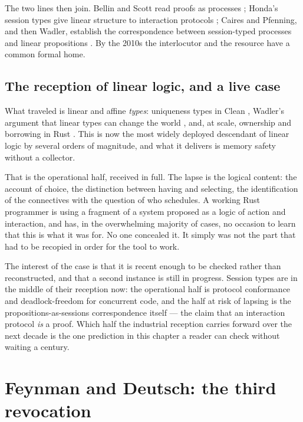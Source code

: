 The two lines then join.
Bellin and Scott read proofs as processes \cite{bellinscott};
Honda's session types give linear structure to interaction protocols
\cite{honda1993}; Caires and Pfenning, and then Wadler, establish
the correspondence between session-typed processes and linear
propositions \cite{cairespfenning,wadler}.
By the 2010s the interlocutor and the resource have a common formal
home.

\subsection{The reception of linear logic, and a live case}

What traveled is linear and affine \emph{types}: uniqueness types in
Clean \cite{barendsen1996}, Wadler's argument that linear types can
change the world \cite{wadler1990}, and, at scale, ownership and
borrowing in Rust \cite{jung2018}.
This is now the most widely deployed descendant of linear logic by
several orders of magnitude, and what it delivers is memory safety
without a collector.

That is the operational half, received in full.
The lapse is the logical content: the account of choice, the
distinction between having and selecting, the identification of the
connectives with the question of who schedules.
A working Rust programmer is using a fragment of a system proposed
as a logic of action and interaction, and has, in the overwhelming
majority of cases, no occasion to learn that this is what it was
for.
No one concealed it.
It simply was not the part that had to be recopied in order for the
tool to work.

The interest of the case is that it is recent enough to be checked
rather than reconstructed, and that a second instance is still in
progress.
Session types are in the middle of their reception now: the
operational half is protocol conformance and deadlock-freedom for
concurrent code, and the half at risk of lapsing is the
propositions-as-sessions correspondence itself --- the claim that an
interaction protocol \emph{is} a proof.
Which half the industrial reception carries forward over the next
decade is the one prediction in this chapter a reader can check
without waiting a century.

\section{Feynman and Deutsch: the third revocation}
\label{psy:sec:quantum}

